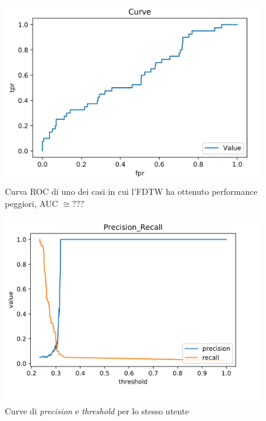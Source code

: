 \documentclass[8pt,notitlepage]{report}
\begin{document}
			\begin{figure}[H]
				\begin{center}
					\includegraphics[scale=.35]{ROC_FDTW_Dario}
					\caption{Curva ROC di uno dei casi in cui l'FDTW ha ottenuto performance peggiori, AUC $ \cong ??? $}
				\end{center}
			\end{figure}
			
			\begin{figure}[H]
				\begin{center}
					\includegraphics[scale=.35]{precision_recall_FDTW_Dario}
					\caption{Curve di \textit{precision} e \textit{threshold} per lo stesso utente}
				\end{center}
			\end{figure}
			
\end{document}
